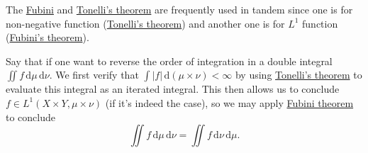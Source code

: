 The \hyperref[thm:Fubini]{Fubini} and \hyperref[thm:Tonelli]{Tonelli's theorem} are frequently used in tandem since one is for non-negative function (\hyperref[thm:Tonelli]{Tonelli's theorem}) and another one is for \(L^1\) function (\hyperref[thm:Fubini]{Fubini's theorem}).

\begin{remark}
	Say that if one want to reverse the order of integration in a double integral \(\iint f \,\mathrm{d} \mu \,\mathrm{d} \nu \). We first verify that \(\int \left\vert f \right\vert \,\mathrm{d} (\mu \times \nu ) < \infty \) by using \hyperref[thm:Tonelli]{Tonelli's theorem} to evaluate this integral as an iterated integral. This then allows us to conclude \(f\in L^1(X \times Y, \mu \times \nu )\) (if it's indeed the case), so we may apply \hyperref[thm:Fubini]{Fubini theorem} to conclude
	\[
		\iint f \,\mathrm{d} \mu \,\mathrm{d} \nu = \iint f \,\mathrm{d} \nu \,\mathrm{d} \mu.
	\]
\end{remark}